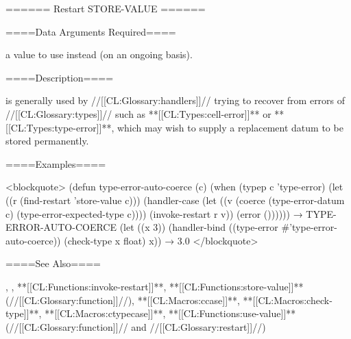 ====== Restart STORE-VALUE ======

====Data Arguments Required====

a value to use instead (on an ongoing basis).

====Description====

 is generally used by //[[CL:Glossary:handlers]]// trying to recover from errors of //[[CL:Glossary:types]]// such as **[[CL:Types:cell-error]]** or **[[CL:Types:type-error]]**, which may wish to supply a replacement datum to be stored permanently.

====Examples====

<blockquote> (defun type-error-auto-coerce (c) (when (typep c 'type-error) (let ((r (find-restart 'store-value c))) (handler-case (let ((v (coerce (type-error-datum c) (type-error-expected-type c)))) (invoke-restart r v)) (error ()))))) → TYPE-ERROR-AUTO-COERCE (let ((x 3)) (handler-bind ((type-error #'type-error-auto-coerce)) (check-type x float) x)) → 3.0 </blockquote>

====See Also====

{\secref\Restarts}, {\secref\InterfacesToRestarts}, **[[CL:Functions:invoke-restart]]**, **[[CL:Functions:store-value]]** (//[[CL:Glossary:function]]//), **[[CL:Macros:ccase]]**, **[[CL:Macros:check-type]]**, **[[CL:Macros:ctypecase]]**, **[[CL:Functions:use-value]]** (//[[CL:Glossary:function]]// and //[[CL:Glossary:restart]]//)

